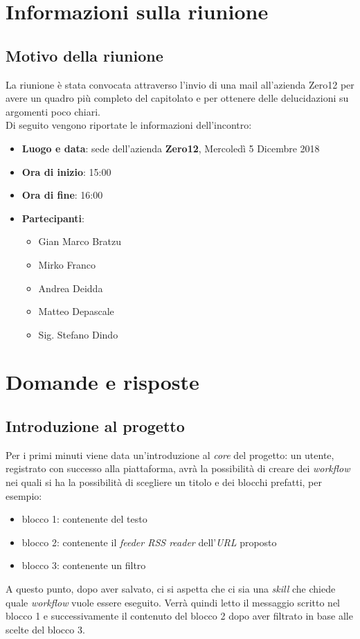 \documentclass[a4paper,12pt]{article}
\begin{document}
	\cleardoublepage
	\pagestyle{mymain}
	
	\tableofcontents
	\cleardoublepage
	
	\section{Informazioni sulla riunione}
	\subsection{Motivo della riunione}
	La riunione è stata convocata attraverso l'invio di una mail all'azienda Zero12 per avere un quadro più completo del capitolato e per ottenere delle delucidazioni su argomenti poco chiari. \\
	Di seguito vengono riportate le informazioni dell'incontro:
	\begin{itemize}
		\item \textbf{Luogo e data}: sede dell'azienda \textbf{Zero12}, Mercoledì 5 Dicembre 2018
		\item \textbf{Ora di inizio}: 15:00
		\item \textbf{Ora di fine}: 16:00
		\item \textbf{Partecipanti}:  
		\begin{itemize}
		\item Gian Marco Bratzu
		\item Mirko Franco
		\item Andrea Deidda
		\item Matteo Depascale
		\item Sig. Stefano Dindo
		\end{itemize}
	\end{itemize}

	\section{Domande e risposte}
	\subsection{Introduzione al progetto}
	Per i primi minuti viene data un'introduzione al \textit{core} del progetto:  un utente, registrato con successo alla piattaforma, avrà la possibilità di creare dei \textit{workflow}  nei quali si ha  la possibilità di scegliere un titolo e  dei blocchi prefatti, per esempio:
	\begin{itemize}
		\item blocco 1: contenente del testo
		\item blocco 2: contenente il \textit{feeder RSS reader} dell'\textit{URL} proposto
		\item blocco 3: contenente un filtro
	\end{itemize}
	A questo punto, dopo aver salvato, ci si aspetta che ci sia una \textit{skill} che chiede quale \textit{workflow} vuole essere eseguito. Verrà quindi letto il messaggio scritto nel blocco 1 e successivamente il contenuto del blocco 2 dopo aver filtrato in base alle scelte del blocco 3.
	
\end{document}
